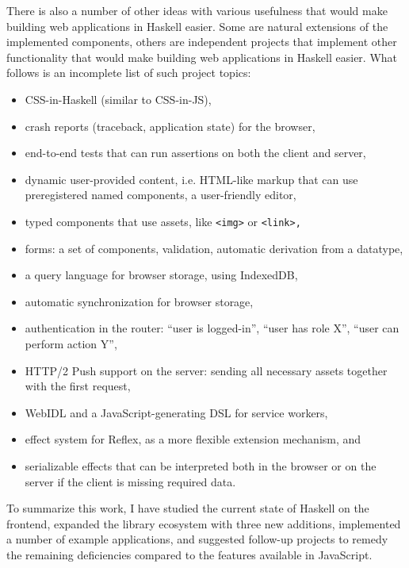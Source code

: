\documentclass[english,zadani,odsaz]{fitthesis}
\begin{document}
There is also a number of other ideas with various usefulness that would make
building web applications in Haskell easier. Some are natural extensions of the
implemented components, others are independent projects that implement other
functionality that would make building web applications in Haskell easier. What
follows is an incomplete list of such project topics:

\begin{itemize}
\item CSS-in-Haskell (similar to CSS-in-JS),
\item crash reports (traceback, application state) for the browser,
\item end-to-end tests that can run assertions on both the client and server,
\item dynamic user-provided content, i.e. HTML-like markup that can use preregistered named
components, a user-friendly editor,
\item typed components that use assets, like \texttt{<img>} or \texttt{<link>,}
\item forms: a set of components, validation, automatic derivation from a datatype,
\item a query language for browser storage, using IndexedDB,
\item automatic synchronization for browser storage,
\item authentication in the router: ``user is logged-in'', ``user has role X'', ``user
can perform action Y'',
\item HTTP/2 Push support on the server: sending all necessary assets together with
the first request,
\item WebIDL and a JavaScript-generating DSL for service workers,
\item effect system for Reflex, as a more flexible extension mechanism, and
\item serializable effects that can be interpreted both in the browser or on the
server if the client is missing required data.
\end{itemize}

To summarize this work, I have studied the current state of Haskell on the
frontend, expanded the library ecosystem with three new additions, implemented a
number of example applications, and suggested follow-up projects to remedy the
remaining deficiencies compared to the features available in JavaScript.

\makeatletter
\def\@openbib@code{\addcontentsline{toc}{chapter}{Bibliography}}
\makeatother

\end{document}
